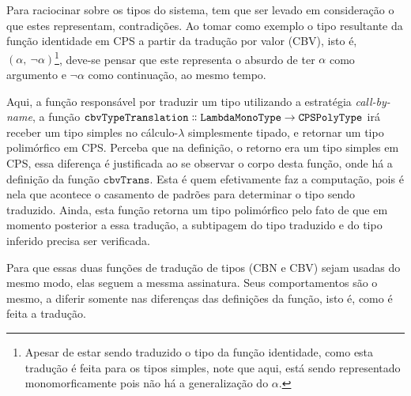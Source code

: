 Para raciocinar sobre os tipos do sistema, tem que ser levado em consideração o que estes representam, contradições.
Ao tomar como exemplo o tipo resultante da função identidade em CPS a partir da tradução por valor (CBV), isto é, $(\alpha,\ \neg\alpha)$\footnote{Apesar de estar sendo traduzido o tipo da função identidade, como esta tradução é feita para os tipos simples, note que aqui, está sendo representado monomorficamente pois não há a generalização do $\alpha$.}, deve-se pensar que este representa o absurdo de ter $\alpha$ como argumento e $\neg\alpha$ como continuação, ao mesmo tempo.


Aqui, a função responsável por traduzir um tipo utilizando a estratégia \textit{call-by-name}, a função $\mathtt{cbvTypeTranslation \dblcolon LambdaMonoType \to CPSPolyType}$ irá receber um tipo simples no cálculo-$\lambda$ simplesmente tipado, e retornar um tipo polimórfico em CPS.
Perceba que na definição, o retorno era um tipo simples em CPS, essa diferença é justificada ao se observar o corpo desta função, onde há a definição da função $\mathtt{cbvTrans}$.
Esta é quem efetivamente faz a computação, pois é nela que acontece o casamento de padrões para determinar o tipo sendo traduzido.
Ainda, esta função retorna um tipo polimórfico pelo fato de que em momento posterior a essa tradução, a subtipagem do tipo traduzido e do tipo inferido precisa ser verificada.


Para que essas duas funções de tradução de tipos (CBN e CBV) sejam usadas do mesmo modo, elas seguem a messma assinatura. 
Seus comportamentos são o mesmo, a diferir somente nas diferenças das definições da função, isto é, como é feita a tradução.
